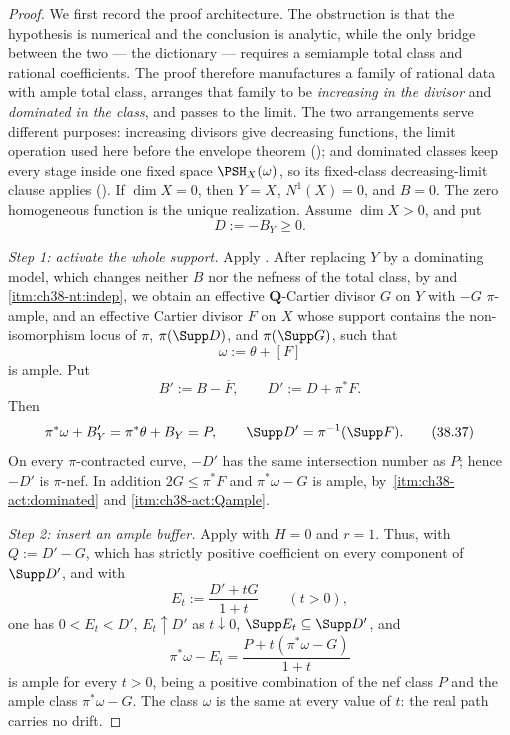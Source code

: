 \begin{proof}
We first record the proof architecture.  The obstruction is that the
hypothesis is numerical and the conclusion is analytic, while the only
bridge between the two --- the dictionary
 --- requires a semiample total class
and rational coefficients.  The proof therefore manufactures a family of
rational data with ample total class, arranges that family to be
\emph{increasing in the divisor} and \emph{dominated in the class}, and
passes to the limit. The two arrangements serve different purposes:
increasing divisors give decreasing functions, the limit
operation used here before the envelope theorem
(); and dominated classes keep every stage inside
one fixed space $\PSH_X(\omega)$, so its fixed-class
decreasing-limit clause applies
().
If $\dim X=0$, then $Y=X$, $N^1(X)=0$, and $B=0$.  The zero
homogeneous function is the unique realization.  Assume $\dim X>0$, and
put
\[
                              D:=-B_Y\ge0.
\]

\medskip
\noindent\emph{Step 1: activate the whole support.}
Apply .  After replacing $Y$ by a dominating
model, which changes neither $B$ nor the nefness of the total class, by
 and
\,\cref{itm:ch38-nt:indep}, we obtain an
effective $\mathbf Q$-Cartier divisor $G$ on $Y$ with $-G$
$\pi$-ample, and an effective Cartier divisor $F$ on $X$ whose
support contains the non-isomorphism locus of $\pi$, $\pi(\Supp D)$,
and $\pi(\Supp G)$, such that
\[
                              \omega:=\theta+[F]
\tag{38.35}\label{eq:bj-activated-class}
\]
is ample.  Put
\[
                         B':=B-\overline F,\qquad
                         D':=D+\pi^*F.
\tag{38.36}\label{eq:bj-activated-data}
\]
Then
\[
 \pi^*\omega+B'_Y=\pi^*\theta+B_Y=P,\qquad
 \Supp D'=\pi^{-1}(\Supp F).
\tag{38.37}\label{eq:bj-activated-total}
\]
On every $\pi$-contracted curve, $-D'$ has the same intersection
number as $P$; hence $-D'$ is $\pi$-nef.  In addition
$2G\leq\pi^*F$ and $\pi^*\omega-G$ is ample, by
\,\cref{itm:ch38-act:dominated} and
\cref{itm:ch38-act:Qample}.

\medskip
\noindent\emph{Step 2: insert an ample buffer.}
Apply  with $H=0$ and $r=1$.  Thus, with
$Q:=D'-G$, which has strictly positive coefficient on every component of
$\Supp D'$, and with
\[
 E_t:=\frac{D'+tG}{1+t}\qquad(t>0),
\]
one has $0<E_t<D'$, $E_t\uparrow D'$ as $t\downarrow0$,
$\Supp E_t\subseteq\Supp D'$, and
\[
 \pi^*\omega-E_t=\frac{P+t(\pi^*\omega-G)}{1+t}
\]
is ample for every $t>0$, being a positive combination of the nef class
$P$ and the ample class $\pi^*\omega-G$.  The class $\omega$ is the
same at every value of $t$: the real path carries no drift.


\end{proof}
